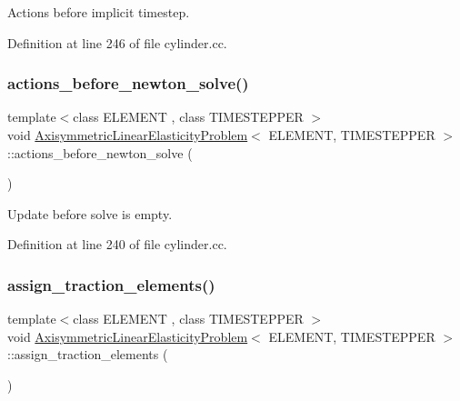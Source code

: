 Actions before implicit timestep. 



Definition at line 246 of file cylinder.\+cc.

\mbox{\label{classAxisymmetricLinearElasticityProblem_a25da062bc76af5ef30619a3f3ff3718f}} 
\subsubsection{\texorpdfstring{actions\+\_\+before\+\_\+newton\+\_\+solve()}{actions\_before\_newton\_solve()}}
{\footnotesize\ttfamily template$<$class E\+L\+E\+M\+E\+NT , class T\+I\+M\+E\+S\+T\+E\+P\+P\+ER $>$ \\
void \hyperlink{classAxisymmetricLinearElasticityProblem}{Axisymmetric\+Linear\+Elasticity\+Problem}$<$ E\+L\+E\+M\+E\+NT, T\+I\+M\+E\+S\+T\+E\+P\+P\+ER $>$\+::actions\+\_\+before\+\_\+newton\+\_\+solve (\begin{DoxyParamCaption}{ }\end{DoxyParamCaption})\hspace{0.3cm}{\ttfamily [inline]}}



Update before solve is empty. 



Definition at line 240 of file cylinder.\+cc.

\mbox{\label{classAxisymmetricLinearElasticityProblem_ab0cfde2632d6711b75744bcc2644ae04}} 
\subsubsection{\texorpdfstring{assign\+\_\+traction\+\_\+elements()}{assign\_traction\_elements()}}
{\footnotesize\ttfamily template$<$class E\+L\+E\+M\+E\+NT , class T\+I\+M\+E\+S\+T\+E\+P\+P\+ER $>$ \\
void \hyperlink{classAxisymmetricLinearElasticityProblem}{Axisymmetric\+Linear\+Elasticity\+Problem}$<$ E\+L\+E\+M\+E\+NT, T\+I\+M\+E\+S\+T\+E\+P\+P\+ER $>$\+::assign\+\_\+traction\+\_\+elements (\begin{DoxyParamCaption}{ }\end{DoxyParamCaption})\hspace{0.3cm}{\ttfamily [private]}}



